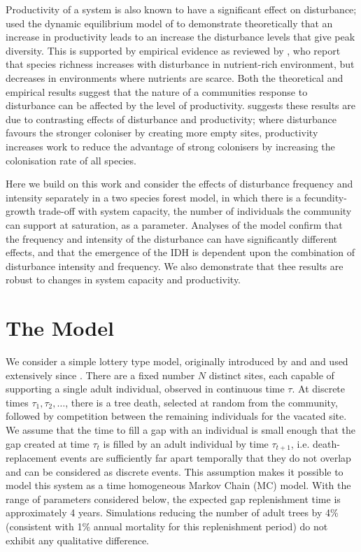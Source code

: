 Productivity of a system is also known to have a significant effect on disturbance; \cite{kondoh2001unifying} used the dynamic equilibrium model of \cite{huston1979general} to demonstrate theoretically that an increase in productivity leads to an increase the disturbance levels that give peak diversity. This is supported by empirical evidence as reviewed by \cite{proulx1998reversal}, who report that species richness increases with disturbance in nutrient-rich environment, but decreases in environments where nutrients are scarce. Both the theoretical and empirical results suggest that the nature of a communities response to disturbance can be affected by the level of productivity. \cite{kondoh2001unifying} suggests these results are due to contrasting effects of disturbance and productivity; where disturbance favours the stronger coloniser by creating more empty sites, productivity increases work to reduce the advantage of strong colonisers by increasing the colonisation rate of all species.

Here we build on this work and consider the effects of disturbance frequency and intensity separately in a two species forest model, in which there is a fecundity-growth trade-off with system capacity, the number of individuals the community can support at saturation, as a parameter. Analyses of the model confirm that the frequency and intensity of the disturbance can have significantly different effects, and that the emergence of the IDH is dependent upon the combination of disturbance intensity and frequency. We also demonstrate that thee results are robust to changes in system capacity and productivity.

\section{The Model}
\label{model}
We consider a simple lottery type model, originally introduced by \cite{sale1978coexistence} and \cite{chesson1981environmental} and used extensively since \citep[e.g.][]{muko2000species,pacala1992herbivores}. There are a fixed number $N$ distinct sites, each capable of supporting a single adult individual, observed in continuous time $\tau$. At discrete times $\tau_1,\tau_2, \dots$, there is a tree death, selected at random from the community, followed by competition between the remaining individuals for the vacated site. We assume that the time to fill a gap with an individual is small enough that the gap created at time $\tau_t$ is filled by an adult individual by time $\tau_{t+1}$, i.e. death-replacement events are sufficiently far apart temporally that they do not overlap and can be considered as discrete events. This assumption makes it possible to model this system as a time homogeneous Markov Chain (MC) model. With the range of parameters considered below, the expected gap replenishment time is approximately 4 years. Simulations reducing the number of adult trees by 4\% (consistent with 1\% annual mortality for this replenishment period) do not exhibit any qualitative difference.

